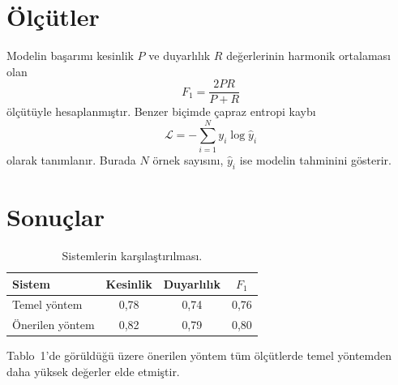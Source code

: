 \documentclass[11pt,a4paper]{article}
\begin{document}
\section{Ölçütler}
Modelin başarımı kesinlik $P$ ve duyarlılık $R$ değerlerinin harmonik ortalaması olan
\begin{equation}
F_1 = \frac{2PR}{P+R}
\end{equation}
ölçütüyle hesaplanmıştır. Benzer biçimde çapraz entropi kaybı
\begin{equation}
\mathcal{L} = -\sum_{i=1}^{N} y_i \log \hat{y}_i
\end{equation}
olarak tanımlanır. Burada $N$ örnek sayısını, $\hat{y}_i$ ise modelin tahminini gösterir.
\section{Sonuçlar}
\paragrafC
\begin{table}[h]
\centering
\caption{Sistemlerin karşılaştırılması.}
\begin{tabular}{|l|c|c|c|}
\hline
Sistem & Kesinlik & Duyarlılık & $F_1$ \\
\hline
Temel yöntem & 0,78 & 0,74 & 0,76 \\
Önerilen yöntem & 0,82 & 0,79 & 0,80 \\
\hline
\end{tabular}
\end{table}
Tablo~1'de görüldüğü üzere önerilen yöntem tüm ölçütlerde temel yöntemden daha yüksek değerler elde etmiştir.
\end{document}
